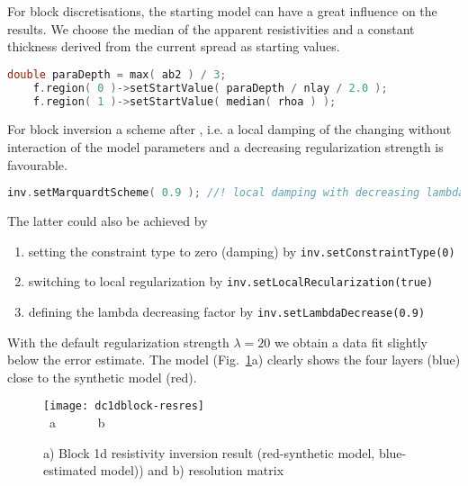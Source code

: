 For block discretisations, the starting model can have a great influence on the results.
We choose the median of the apparent resistivities and a constant thickness derived from the current spread as starting values.
\begin{lstlisting}[language=C++]
    double paraDepth = max( ab2 ) / 3;		
    f.region( 0 )->setStartValue( paraDepth / nlay / 2.0 );
    f.region( 1 )->setStartValue( median( rhoa ) );
\end{lstlisting}

For block inversion a scheme after \cite{marquardt}, i.e. a local damping of the changing without interaction of the model parameters and a decreasing regularization strength is favourable.
\begin{lstlisting}[language=C++]
    inv.setMarquardtScheme( 0.9 ); //! local damping with decreasing lambda
\end{lstlisting}

The latter could also be achieved by \begin{enumerate}
	\item setting the constraint type to zero (damping) by \lstinline|inv.setConstraintType(0)|
	\item switching to local regularization by \lstinline|inv.setLocalRecularization(true)|
	\item defining the lambda decreasing factor by \lstinline|inv.setLambdaDecrease(0.9)|
\end{enumerate}


With the default regularization strength $\lambda=20$ we obtain a data fit slightly below the error estimate.
The model (Fig.~\ref{fig:dc1dblock-resres}a) clearly shows the four layers (blue) close to the synthetic model (red).

\begin{figure}[htbp]
\centering\texttt{[image: dc1dblock-resres]}\\[-3ex]
~\hfill a\hfill ~ \hfill ~~~~~b \hfill ~ \hfill ~ \hfill ~
\caption{a) Block 1d resistivity inversion result (red-synthetic model, blue-estimated model)) and b) resolution matrix}\label{fig:dc1dblock-resres}
\end{figure}

